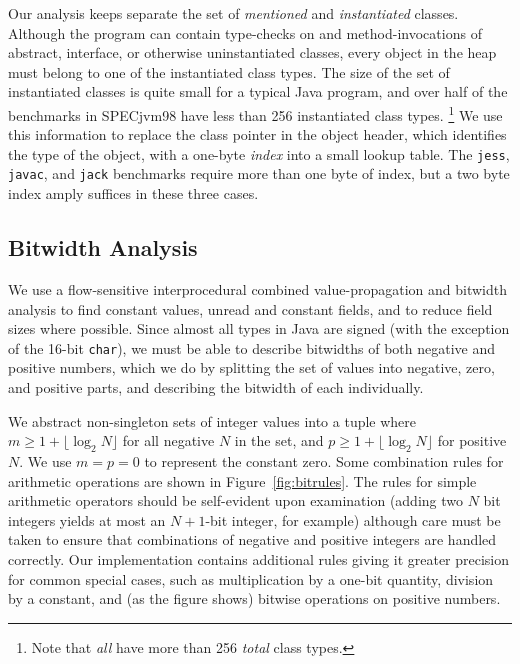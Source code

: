 \documentclass{sig-alt-full}
\begin{document}
Our analysis keeps separate the set of {\it mentioned} and
{\it instantiated} classes.
Although the program can contain type-checks on and method-invocations
of abstract, interface, or otherwise uninstantiated classes,
every object
in the heap must belong to one of the instantiated class types.
The size of the set of instantiated classes is quite small for a
typical Java program, and over half of the benchmarks in SPECjvm98
have less than 256 instantiated class types.%
\footnote{Note that \emph{all} have more than 256 \emph{total} class types.}
We use this information
to replace the class pointer in the object header, which
identifies the type of the object, with a one-byte {\it index} into a
small lookup table.  The {\tt jess}, {\tt javac}, and {\tt jack}
benchmarks require more than one byte of index, but a two byte index
amply suffices in these three cases.
%

\subsection{Bitwidth Analysis}
We use a flow-sensitive interprocedural combined value-propagation and
bitwidth analysis to
find constant values, unread and constant fields, and to reduce
field sizes where possible.
Since almost all types in Java are signed (with the exception of the
16-bit {\tt char}), we must be able to describe bitwidths of both
negative and positive numbers, which we do by splitting the set of
values into negative, zero, and positive parts, and describing the
bitwidth of each individually.

We abstract non-singleton sets of integer values into a tuple
 where $m\ge 1+\lfloor\log_2 N\rfloor$ for all negative $N$
in the set, and $p\ge 1+\lfloor\log_2 N\rfloor$ for positive $N$.  We
use $m=p=0$ to represent the constant zero.
Some combination rules for arithmetic operations are
shown in Figure~\ref{fig:bitrules}.  The rules for simple arithmetic
operators should be self-evident upon examination (adding two $N$ bit
integers yields at most an $N+1$-bit integer, for example) although
care must be taken to ensure that combinations of negative and
positive integers are handled correctly.  Our implementation contains
additional rules giving it greater precision for common special cases,
such as multiplication by
a one-bit quantity, division by a constant, and (as the figure shows)
bitwise operations on positive numbers.
\end{document}
